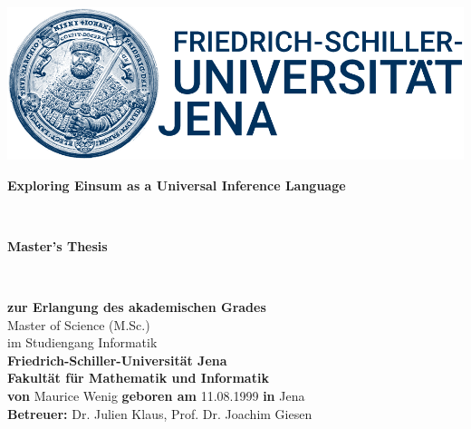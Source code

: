 \documentclass[twoside, fontsize=12pt, parskip=half-]{scrbook}
\begin{document}
\frontmatter
\thispagestyle{empty}
\begin{titlepage}
	\centering
	\vspace*{3cm}
	\includegraphics{hanfried_logo.png}
	\bigskip\\
	\begin{LARGE}
		\textbf{Exploring Einsum as a Universal Inference Language}
	\end{LARGE}
	\vspace{2cm}\\
	\begin{Large}
		\textbf{Master's Thesis}
	\end{Large}\vspace{3mm}\\
	\begin{large}
		\begin{spacing}{1.6}
			\textbf{zur Erlangung des akademischen Grades}\\
			Master of Science (M.Sc.)\\
			im Studiengang Informatik\vspace{3mm}\\
			\textbf{Friedrich-Schiller-Universität Jena\\
				Fakultät für Mathematik und Informatik}\vspace{3mm}\\
			\textbf{von} Maurice Wenig \textbf{geboren am} 11.08.1999 \textbf{in} Jena\\
			\textbf{Betreuer:} Dr. Julien Klaus, Prof. Dr. Joachim Giesen
		\end{spacing}
	\end{large}
\end{titlepage}
\cleardoublepage


\setcounter{tocdepth}{1}
\tableofcontents


\mainmatter
\fancyhead[LO,RE]{\itshape\nouppercase\leftmark}





\typeout{}


\backmatter

\listoffigures
\listoftables
\appendix

\end{document}
